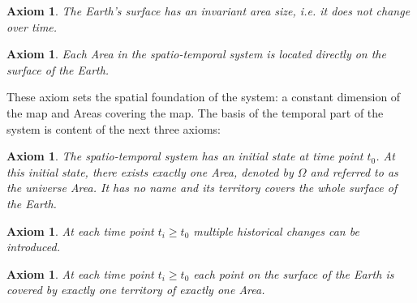 \vspace{-1.0em}
\newtheorem{invariant_surface}[assicounter]{Axiom}
\begin{invariant_surface}
\label{axm:invariant_surface}
  The Earth's surface has an invariant area size, i.e. it does not change over time.
\end{invariant_surface}

\vspace{-2.5em}
\newtheorem{area_on_surface}[assicounter]{Axiom}
\begin{area_on_surface}
\label{axm:area_on_surface}
  Each Area in the spatio-temporal system is located directly on the surface of the Earth.
\end{area_on_surface}

These axiom sets the spatial foundation of the system: a constant dimension of the map and Areas covering the map. The basis of the temporal part of the system is content of the next three axioms:

\vspace{-1.0em}
\newtheorem{initial_configuration}[assicounter]{Axiom}
\begin{initial_configuration}
\label{axm:initial_configuration}
  The spatio-temporal system has an initial state at time point $t_0$. At this initial state, there exists exactly one Area, denoted by $\Omega$ and referred to as the \emph{universe} Area. It has no name and its territory covers the whole surface of the Earth.
\end{initial_configuration}

\vspace{-2.5em}
\newtheorem{historical_change}[assicounter]{Axiom}
\begin{historical_change}
\label{axm:historical_change}
  At each time point $t_i \geq t_0$ multiple historical changes can be introduced.
\end{historical_change}

\vspace{-2.5em}
\newtheorem{unique_coverage}[assicounter]{Axiom}
\begin{unique_coverage}
\label{axm:unique_coverage}
  At each time point $t_i \geq t_0$ each point on the surface of the Earth is covered by exactly one territory of exactly one Area.
\end{unique_coverage}

